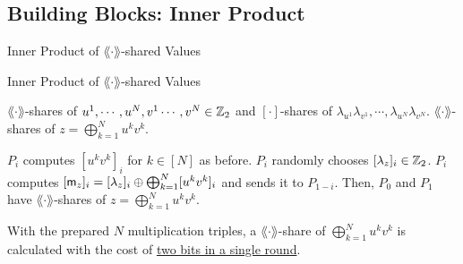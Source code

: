 \documentclass[../240906_cryptlab_flute.tex]{subfiles}
\begin{document}
\subsection{Building Blocks: Inner Product}
\begin{frame}{Inner Product of \(\lang\cdot\rang\)-shared Values}
    \begin{block}{Inner Product of \(\lang\cdot\rang\)-shared Values}
        \begin{description}[Output]
            \ii[Input]
            \(\lang\cdot\rang\)-shares of \(u^1, \cdots, u^N, v^1 \cdots, v^N \in \mathbb{Z}_2\)
            and \([\cdot]\)-shares of \(\lambda_{u^1} \lambda_{v^1},
            \cdots, \lambda_{u^N} \lambda_{v^N}\).
            \ii[Output]
            \(\lang\cdot\rang\)-shares of \(z = \bigoplus_{k=1}^N u^k v^k\).
        \end{description}
        \pause
        \begin{enumerate}
            \ii \(P_i\) computes \([u^k v^k]_i\) for \(k \in [N]\) as before.
            \pause
            \ii \(P_i\) randomly chooses \([\lambda_z]_i \in \mathbb{Z}_2\).
            \ii \(P_i\) computes
            \([\mathsf{m}_z]_i = [\lambda_z]_i \oplus \bigoplus_{k=1}^N [u^k v^k]_i\)
            and sends it to \(P_{1-i}\).
            \ii
            Then, \(P_0\) and \(P_1\) have \(\lang\cdot\rang\)-shares of \(z = \bigoplus_{k=1}^N u^k v^k\).
        \end{enumerate}
        \pause
        With the prepared \(N\) multiplication triples,
        a \(\lang\cdot\rang\)-share of \(\bigoplus_{k=1}^N u^k v^k\)
        is calculated with the cost of \ul{two bits in a single round}.
    \end{block}
\end{frame}
\end{document}
